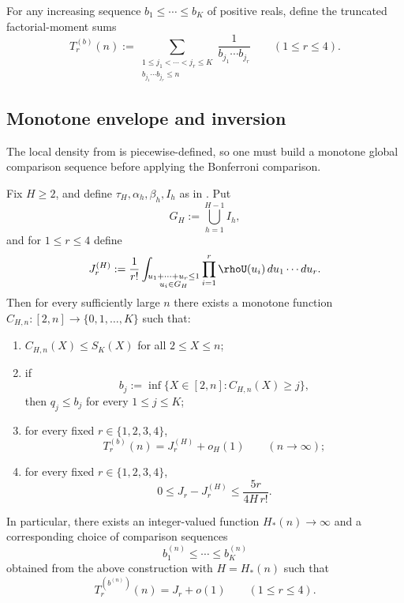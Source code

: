 For any increasing sequence $b_1\le \cdots \le b_K$ of positive reals, define
the truncated factorial-moment sums
\[
  T_r^{(b)}(n)
  :=
  \sum_{\substack{1\le j_1<\cdots<j_r\le K\\b_{j_1}\cdots b_{j_r}\le n}}
  \frac{1}{b_{j_1}\cdots b_{j_r}}
  \qquad (1\le r\le 4).
\]

\subsection{Monotone envelope and inversion}

The local density from  is piecewise-defined, so one
must build a monotone global comparison sequence before applying the
Bonferroni comparison.

\begin{proposition}\label{prop:envelope-inversion}
Fix $H\ge 2$, and define $\tau_H,\alpha_h,\beta_h,I_h$ as in
.  Put
\[
  G_H := \bigcup_{h=1}^{H-1} I_h,
\]
and for $1\le r\le 4$ define
\[
  J_r^{(H)}
  :=
  \frac1{r!}
  \int_{\substack{u_1+\cdots+u_r\le 1\\u_i\in G_H}}
  \prod_{i=1}^r \rhoU(u_i)\,du_1\cdots du_r.
\]
Then for every sufficiently large $n$ there exists a monotone function
$C_{H,n}:[2,n]\to\{0,1,\dots,K\}$ such that:
\begin{enumerate}
  \item $C_{H,n}(X)\le S_K(X)$ for all $2\le X\le n$;
  \item if
    \[
      b_j := \inf\{X\in[2,n]: C_{H,n}(X)\ge j\},
    \]
    then $q_j \le b_j$ for every $1\le j\le K$;
  \item for every fixed $r\in\{1,2,3,4\}$,
    \[
      T_r^{(b)}(n)=J_r^{(H)}+o_H(1)
      \qquad (n\to\infty);
    \]
  \item for every fixed $r\in\{1,2,3,4\}$,
    \[
      0\le J_r-J_r^{(H)}\le \frac{5r}{4H\,r!}.
    \]
\end{enumerate}
In particular, there exists an integer-valued function $H_*(n)\to\infty$ and a
corresponding choice of comparison sequences
\[
  b_1^{(n)}\le \cdots \le b_K^{(n)}
\]
obtained from the above construction with $H=H_*(n)$ such that
\[
  T_r^{(b^{(n)})}(n)=J_r+o(1)
  \qquad (1\le r\le 4).
\]
\end{proposition}

